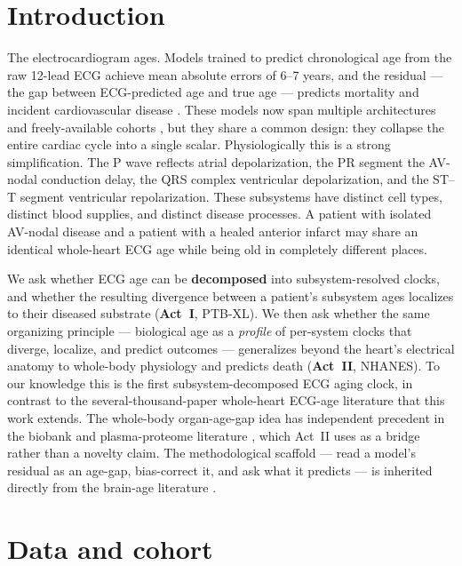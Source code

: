 \documentclass[11pt]{article}
\begin{document}
\section{Introduction}

The electrocardiogram ages. Models trained to predict chronological age from the raw 12-lead
ECG achieve mean absolute errors of 6--7 years, and the residual --- the gap between
ECG-predicted age and true age --- predicts mortality and incident cardiovascular disease
\citep{attia2019ecgage, lima2021ecgage, ladejobi2021ecgage}. These models now span multiple
architectures and freely-available cohorts \citep{barros2024ecgage, wang2025ecgage}, but they
share a common design: they collapse the entire cardiac cycle into a single scalar.
Physiologically this is a strong simplification. The P wave reflects atrial depolarization,
the PR segment the AV-nodal conduction delay, the QRS complex ventricular depolarization, and
the ST--T segment ventricular repolarization. These subsystems have distinct cell types,
distinct blood supplies, and distinct disease processes. A patient with isolated AV-nodal
disease and a patient with a healed anterior infarct may share an identical whole-heart ECG
age while being old in completely different places.

We ask whether ECG age can be \textbf{decomposed} into subsystem-resolved clocks, and whether
the resulting divergence between a patient's subsystem ages localizes to their diseased
substrate (\textbf{Act~I}, PTB-XL). We then ask whether the same organizing principle ---
biological age as a \emph{profile} of per-system clocks that diverge, localize, and predict
outcomes --- generalizes beyond the heart's electrical anatomy to whole-body physiology and
predicts death (\textbf{Act~II}, NHANES). To our knowledge this is the first
subsystem-decomposed ECG aging clock, in contrast to the several-thousand-paper whole-heart
ECG-age literature that this work extends. The whole-body organ-age-gap idea has independent
precedent in the biobank and plasma-proteome literature \citep{tian2023organage,
oh2023organage}, which Act~II uses as a bridge rather than a novelty claim. The methodological
scaffold --- read a model's residual as an age-gap, bias-correct it, and ask what it predicts
--- is inherited directly from the brain-age literature \citep{cole2018brainage,
beheshti2019biascorr, delange2020biascorr}.

\section{Data and cohort}
\end{document}
